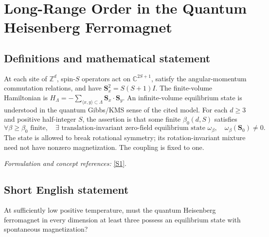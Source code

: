 \documentclass[11pt]{article}
\newcommand{\Z}{\mathbb{Z}}
\newcommand{\C}{\mathbb{C}}
\newcommand{\sref}[2]{\hyperlink{source:#1:#2}{[S#2]}}
\newif\ifshowcatalogue
\newcommand{\cataloguescope}[1]{\ifshowcatalogue
	\paragraph{Exact scope in the supplied catalogue.}
	\begin{quote}\small #1\end{quote}\fi}
\begin{document}
\setcounter{section}{0}
	\clearpage
\section*{\texorpdfstring{Long-Range Order in the Quantum Heisenberg Ferromagnet}{Long-Range Order in the Quantum Heisenberg Ferromagnet}}\label{30006979}
\subsection{Definitions and mathematical statement}
At each site of $\Z^d$, spin-$S$ operators act on $\C^{2S+1}$, satisfy the angular-momentum commutation relations, and have $\mathbf S_x^2=S(S+1)I$. The finite-volume Hamiltonian is
	$H_\Lambda=-\sum_{\langle x,y\rangle\subset\Lambda}\mathbf S_x\cdot\mathbf S_y$.
	An infinite-volume equilibrium state is understood in the quantum Gibbs/KMS sense of the cited model. For each $d\ge3$ and positive half-integer $S$, the assertion is that some finite $\beta_0(d,S)$ satisfies
	\[
	\forall\beta\ge\beta_0\text{ finite},\quad
	\exists\text{ translation-invariant zero-field equilibrium state }\omega_\beta,
	\quad\omega_\beta(\mathbf S_0)\ne0.
	\]
	The state is allowed to break rotational symmetry; its rotation-invariant mixture need not have nonzero magnetization. The coupling is fixed to one.
	\par\smallskip\textit{Formulation and concept references:} \sref{30006979}{1}.
	\cataloguescope{For the nearest-neighbor isotropic spin-S quantum Heisenberg ferromagnet on Z\textasciicircum{}d with Hamiltonian H=-sum\_\{<x,y>\} S\_x dot S\_y, assert: for every integer d>=3 and every S in\{1/2,1,3/2,...\}, there is a finite beta\_0(d,S)>0 such that for each finite beta>=beta\_0 the infinite-volume zero-field model admits a translation-invariant equilibrium Gibbs state with nonzero spin expectation. Nonzero expectation refers to spontaneous magnetization in a symmetry-breaking state, not the rotation-invariant mixture. Coupling J=1 fixes temperature units; no pointwise-correlation equivalence is asserted.}

\subsection{Short English statement}
At sufficiently low positive temperature, must the quantum Heisenberg ferromagnet in every dimension at least three possess an equilibrium state with spontaneous magnetization?
\end{document}
